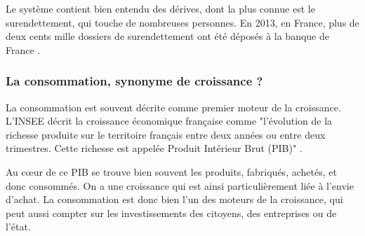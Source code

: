 Le système contient bien entendu des dérives, dont la plus connue est le surendettement, qui touche de nombreuses personnes. En 2013, en France, plus de deux cents mille dossiers de surendettement ont été déposés à la banque de France \cite{BanqueFranceEndettement}.


\subsubsection{La consommation, synonyme de croissance ?}
La consommation est souvent décrite comme premier moteur de la croissance. L'INSEE  décrit la croissance économique française comme "l’évolution de la richesse produite sur le territoire français entre deux années ou entre deux trimestres. Cette richesse est appelée Produit Intérieur Brut (PIB)" \cite{INSEEcroissance}.

Au cœur de ce PIB se trouve bien souvent les produits, fabriqués, achetés, et donc consommés. On a une croissance qui est ainsi particulièrement liée à l'envie d'achat. La consommation est donc bien l'un des moteurs de la croissance, qui peut aussi compter sur les investissements des citoyens, des entreprises ou de l'état.


